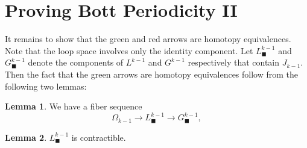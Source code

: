 \documentclass{shortart}
\theoremstyle{definition}
\newtheorem*{lemma}{Lemma}
\begin{document}
\section{Proving Bott Periodicity II}
It remains to show that the green and red arrows are homotopy equivalences. Note that the loop space involves only the identity component. Let $L_\blacksquare^{k - 1}$ and $G_\blacksquare^{k - 1}$ denote the components of $L^{k - 1}$ and $G^{k - 1}$ respectively that contain $J_{k - 1}$. Then the fact that the green arrows are homotopy equivalences follow from the following two lemmas:

\begin{lemma}
  We have a fiber sequence
  \[
    \Omega_{k - 1} \to L_\blacksquare^{k - 1} \to G_\blacksquare^{k - 1},
  \]
\end{lemma}

\begin{lemma}
  $L_\blacksquare^{k - 1}$ is contractible.
\end{lemma}
\end{document}

